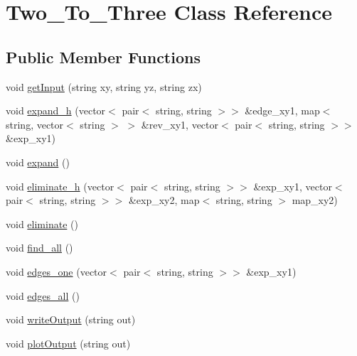 \hypertarget{class_two___to___three}{}\section{Two\+\_\+\+To\+\_\+\+Three Class Reference}
\label{class_two___to___three}
\subsection*{Public Member Functions}
\begin{DoxyCompactItemize}
\item 
void \hyperlink{class_two___to___three_a8cb0750fd7f06f63f7c3959832d14b50}{get\+Input} (string xy, string yz, string zx)
\item 
void \hyperlink{class_two___to___three_a573db0749ff0865895c0ee59b11af430}{expand\+\_\+h} (vector$<$ pair$<$ string, string $>$$>$ \&edge\+\_\+xy1, map$<$ string, vector$<$ string $>$ $>$ \&rev\+\_\+xy1, vector$<$ pair$<$ string, string $>$$>$ \&exp\+\_\+xy1)
\item 
void \hyperlink{class_two___to___three_a33d7852f618104a0580629062bdb23df}{expand} ()
\item 
void \hyperlink{class_two___to___three_af04b2b2c81700169a740b7527f4fab5b}{eliminate\+\_\+h} (vector$<$ pair$<$ string, string $>$$>$ \&exp\+\_\+xy1, vector$<$ pair$<$ string, string $>$$>$ \&exp\+\_\+xy2, map$<$ string, string $>$ map\+\_\+xy2)
\item 
void \hyperlink{class_two___to___three_a8699e9b6b281e00271e1368ef088b14d}{eliminate} ()
\item 
void \hyperlink{class_two___to___three_a9dbc9fdd8e73ae2e3a974a624a33a6b0}{find\+\_\+all} ()
\item 
void \hyperlink{class_two___to___three_ad3a0d8e135d0dc58386e0055c70fe105}{edges\+\_\+one} (vector$<$ pair$<$ string, string $>$$>$ \&exp\+\_\+xy1)
\item 
void \hyperlink{class_two___to___three_a1b181eea2c5309d5264f27a7bb055168}{edges\+\_\+all} ()
\item 
void \hyperlink{class_two___to___three_af29125458d6479842f70e4a6c3fd0301}{write\+Output} (string out)
\item 
void \hyperlink{class_two___to___three_a3638cd9c0c945fa6eec51b890cb5a73b}{plot\+Output} (string out)
\end{DoxyCompactItemize}
